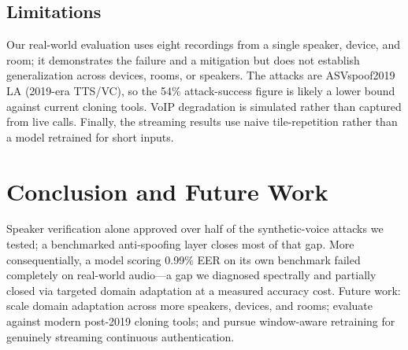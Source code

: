 \documentclass[conference]{IEEEtran}
\begin{document}
\subsection{Limitations}

Our real-world evaluation uses eight recordings from a single speaker, device,
and room; it demonstrates the failure and a mitigation but does not establish
generalization across devices, rooms, or speakers. The attacks are ASVspoof2019
LA (2019-era TTS/VC), so the 54\% attack-success figure is likely a lower bound
against current cloning tools. VoIP degradation is simulated rather than
captured from live calls. Finally, the streaming results use naive
tile-repetition rather than a model retrained for short inputs.

\section{Conclusion and Future Work}\label{sec:concl}

Speaker verification alone approved over half of the synthetic-voice attacks we
tested; a benchmarked anti-spoofing layer closes most of that gap. More
consequentially, a model scoring 0.99\% EER on its own benchmark failed
completely on real-world audio---a gap we diagnosed spectrally and partially
closed via targeted domain adaptation at a measured accuracy cost. Future work:
scale domain adaptation across more speakers, devices, and rooms; evaluate
against modern post-2019 cloning tools; and pursue window-aware retraining for
genuinely streaming continuous authentication.
\end{document}
